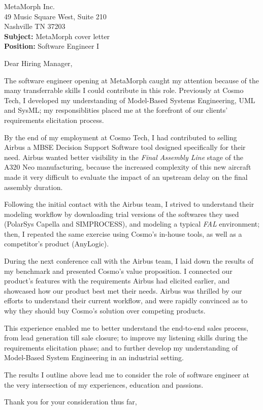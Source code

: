 \documentclass{letter}
\begin{document}
\begin{letter}{MetaMorph Inc.\\49 Music Square West, Suite 210\\Nashville TN 37203\\
\bigskip
\textbf{Subject:} MetaMorph cover letter\\
\textbf{Position:} Software Engineer I\\
}

\opening{Dear Hiring Manager,}

The software engineer opening at MetaMorph caught my attention because of the many transferrable skills I could contribute in this role.
Previously at Cosmo Tech, I developed my understanding of Model-Based Systems Engineering, UML and SysML; my responsiblities placed me at the forefront of our clients' requirements elicitation process. 

By the end of my employment at Cosmo Tech, I had contributed to selling Airbus a MBSE Decision Support Software tool designed specifically for their need.
Airbus wanted better visibility in the \textit{Final Assembly Line} stage of the A320 Neo manufacturing, because the increased complexity of this new aircraft made it very difficult to evaluate the impact of an upstream delay on the final assembly duration.

Following the initial contact with the Airbus team, I strived to understand their modeling workflow by downloading trial versions of the softwares they used (PolarSys Capella and SIMPROCESS), and modeling a typical \textit{FAL} environment;
then, I repeated the same exercise using Cosmo's in-house tools, as well as a competitor's product (AnyLogic).

During the next conference call with the Airbus team, I laid down the results of my benchmark and presented Cosmo's value proposition.
I connected our product's features with the requirements Airbus had elicited earlier, and showcased how our product best met their needs.
Airbus was thrilled by our efforts to understand their current workflow, and were rapidly convinced as to why they should buy Cosmo's solution over competing products.

This experience enabled me to better understand the end-to-end sales process, from lead generation till sale closure;
to improve my listening skills during the requirements elicitation phase;
and to further develop my understanding of Model-Based System Engineering in an industrial setting. 

The results I outline above lead me to consider the role of software engineer at the very intersection of my experiences, education and passions.

\closing{Thank you for your consideration thus far,}

\end{letter}
\end{document}

